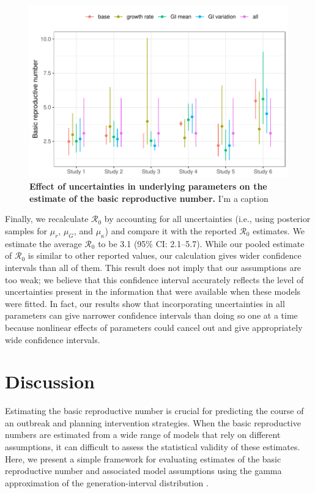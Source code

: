 \documentclass[12pt]{article}
\begin{document}
\begin{figure}[t]
\includegraphics[width=\textwidth]{compare_R0.pdf}
\caption{
\textbf{Effect of uncertainties in underlying parameters on the estimate of the basic reproductive number.}
I'm a caption
}
\label{fig:R0}
\end{figure}

Finally, we recalculate $\mathcal R_0$ by accounting for all uncertainties (i.e., using posterior samples for $\mu_r$, $\mu_G$, and $\mu_\kappa$) and compare it with the reported $\mathcal R_0$ estimates.
We estimate the average $\mathcal R_0$ to be 3.1 (95\% CI: 2.1--5.7).
While our pooled estimate of $\mathcal R_0$ is similar to other reported values, our calculation gives wider confidence intervals than all of them.
This result does not imply that our assumptions are too weak;
we believe that this confidence interval accurately reflects the level of uncertainties present in the information that were available when these models were fitted.
In fact, our results show that incorporating uncertainties in all parameters can give narrower confidence intervals than doing so one at a time because nonlinear effects of parameters could cancel out and give appropriately wide confidence intervals.

\section{Discussion}

Estimating the basic reproductive number is crucial for predicting the course of an outbreak and planning intervention strategies.
When the basic reproductive numbers are estimated from a wide range of models that rely on different assumptions, 
it can difficult to assess the statistical validity of these estimates.
Here, we present a simple framework for evaluating estimates of the basic reproductive number and associated model assumptions using the gamma approximation of the generation-interval distribution \citep{park2019practical}.


\pagebreak


\end{document}
